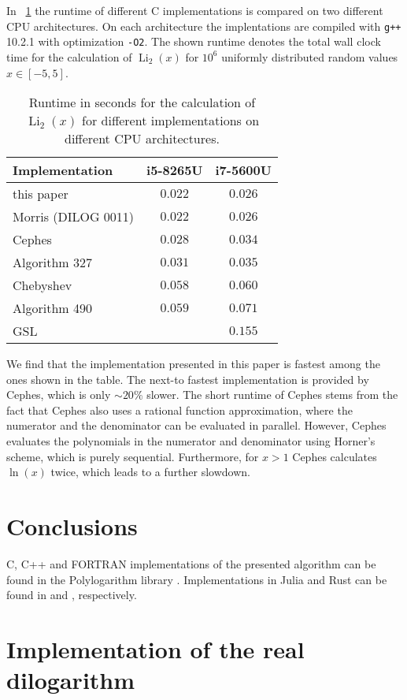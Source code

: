 \documentclass[10pt,DIV16,twocolumn,numbers=noenddot]{scrartcl}
\newcommand{\Li}{\operatorname{Li}_2}
\newcommand{\tabref}[1]{\tablename~\ref{#1}}
\begin{document}
In \tabref{tab:runtime} the runtime of different C implementations is
compared on two different CPU architectures.  On each architecture the
implentations are compiled with \texttt{g++} 10.2.1 with optimization
\texttt{-O2}.  The shown runtime denotes the total wall clock time for
the calculation of $\Li(x)$ for $10^6$ uniformly distributed random
values $x\in[-5,5]$.
%
\begin{table}[tb]
  \centering
  \caption{Runtime in seconds for the calculation of $\Li(x)$ for
    different implementations on different CPU architectures.}
  \begin{tabular}{lcc}
    \toprule
    Implementation & i5-8265U & i7-5600U \\
    \midrule
    this paper & $0.022$ & $0.026$ \\
    Morris (DILOG 0011) \cite{morris} & $0.022$ & $0.026$ \\
    Cephes \cite{cephes} & $0.028$ & $0.034$ \\
    Algorithm 327 \cite{koelbigDilog} & $0.031$ & $0.035$ \\
    Chebyshev \cite{luke} & $0.058$ & $0.060$ \\
    Algorithm 490 \cite{ginsberg} & $0.059$ & $0.071$ \\
    GSL \cite{gsl} & & $0.155$ \\
    \bottomrule
  \end{tabular}
  \label{tab:runtime}
\end{table}
%
We find that the implementation presented in this paper is fastest
among the ones shown in the table.  The next-to fastest implementation
is provided by Cephes, which is only $\sim 20\%$ slower.  The short
runtime of Cephes stems from the fact that Cephes also uses a rational
function approximation, where the numerator and the denominator can be
evaluated in parallel.  However, Cephes evaluates the polynomials in
the numerator and denominator using Horner's scheme, which is purely
sequential.  Furthermore, for $x>1$ Cephes calculates $\ln(x)$ twice,
which leads to a further slowdown.

\section{Conclusions}

C, C++ and FORTRAN implementations of the presented algorithm can be
found in the Polylogarithm library \cite{polylogarithm}.
Implementations in Julia and Rust can be found in \cite{PolyLog.jl}
and \cite{polylog}, respectively.

\appendix

\section{Implementation of the real dilogarithm}






\end{document}
